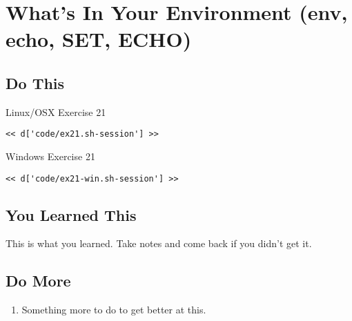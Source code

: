 \chapter{What's In Your Environment (env, echo, SET, ECHO)}

\section{Do This}

\begin{code}{Linux/OSX Exercise 21}
\begin{Verbatim}
<< d['code/ex21.sh-session'] >>
\end{Verbatim}
\end{code}

\begin{code}{Windows Exercise 21}
\begin{Verbatim}
<< d['code/ex21-win.sh-session'] >>
\end{Verbatim}
\end{code}

\section{You Learned This}

This is what you learned.  Take notes and come back if you didn't get it.

\section{Do More}

\begin{enumerate}
\item Something more to do to get better at this.
\end{enumerate}

